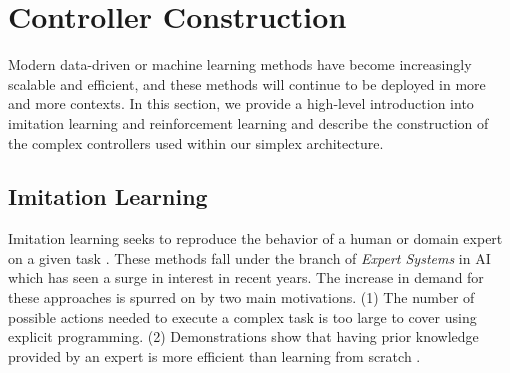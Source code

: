 \documentclass[manuscript,screen,review]{acmart}
\begin{document}

\section{Controller Construction}

Modern data-driven or machine learning methods have become increasingly scalable and efficient, and these methods will continue to be deployed in more and more contexts. In this section, we provide a high-level introduction into imitation learning and reinforcement learning and describe the construction of the complex controllers used within our simplex architecture.

\subsection{Imitation Learning}

Imitation learning seeks to reproduce the behavior of a human or domain expert on a given task \cite{Hussein2017ImitationL}. These methods fall under the branch of \textit{Expert Systems} in AI which has seen a surge in interest in recent years. The increase in demand for these approaches is spurred on by two main motivations. (1) The number of possible actions needed to execute a complex task is too large to cover using explicit programming. (2) Demonstrations show that having prior knowledge provided by an expert is more efficient than learning from scratch \cite{Hussein2017ImitationL}.
\end{document}
